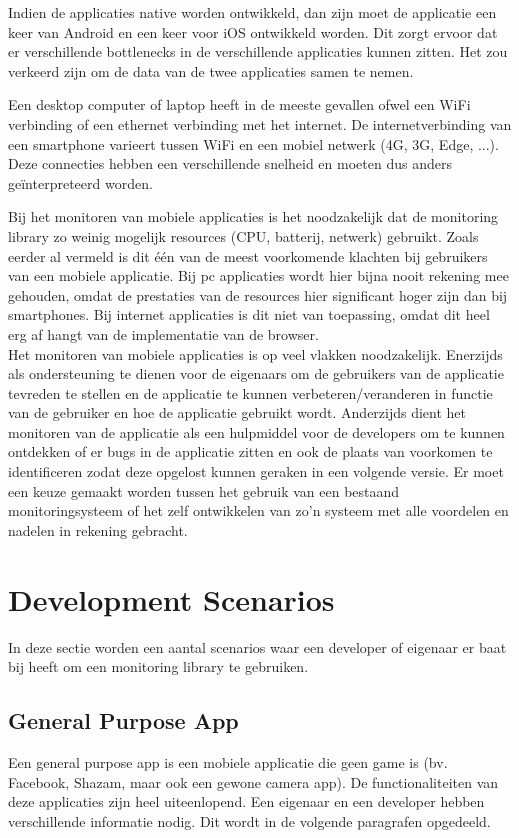 Indien de applicaties native worden ontwikkeld, dan zijn moet de applicatie een keer van Android en een keer voor iOS ontwikkeld worden. Dit zorgt ervoor dat er verschillende bottlenecks in de verschillende applicaties kunnen zitten. Het zou verkeerd zijn om de data van de twee applicaties samen te nemen. 

Een desktop computer of laptop heeft in de meeste gevallen ofwel een WiFi verbinding of een ethernet verbinding met het internet. De internetverbinding van een smartphone varieert tussen WiFi en een mobiel netwerk (4G, 3G, Edge, ...). Deze connecties hebben een verschillende snelheid en moeten dus anders ge\"interpreteerd worden. 

Bij het monitoren van mobiele applicaties is het noodzakelijk dat de monitoring library zo weinig mogelijk resources (CPU, batterij, netwerk) gebruikt. Zoals eerder al vermeld is dit \'e\'en van de meest voorkomende klachten bij gebruikers van een mobiele applicatie. Bij pc applicaties wordt hier bijna nooit rekening mee gehouden, omdat de prestaties van de resources hier significant hoger zijn dan bij smartphones. Bij internet applicaties is dit niet van toepassing, omdat dit heel erg af hangt van de implementatie van de browser. \\


Het monitoren van mobiele applicaties is op veel vlakken noodzakelijk. Enerzijds als ondersteuning te dienen voor de eigenaars om de gebruikers van de applicatie tevreden te stellen en de applicatie te kunnen verbeteren/veranderen in functie van de gebruiker en hoe de applicatie gebruikt wordt. Anderzijds dient het monitoren van de applicatie als een hulpmiddel voor de developers om te kunnen ontdekken of er bugs in de applicatie zitten en ook de plaats van voorkomen te identificeren zodat deze opgelost kunnen geraken in een volgende versie. Er moet een keuze gemaakt worden tussen het gebruik van een bestaand monitoringsysteem of het zelf ontwikkelen van zo'n systeem met alle voordelen en nadelen in rekening gebracht. \\


\section{Development Scenarios}
In deze sectie worden een aantal scenarios waar een developer of eigenaar er baat bij heeft om een monitoring library te gebruiken. 

\subsection{General Purpose App}
Een general purpose app is een mobiele applicatie die geen game is (bv. Facebook, Shazam, maar ook een gewone camera app). De functionaliteiten van deze applicaties zijn heel uiteenlopend. Een eigenaar en een developer hebben verschillende informatie nodig. Dit wordt in de volgende paragrafen opgedeeld.

